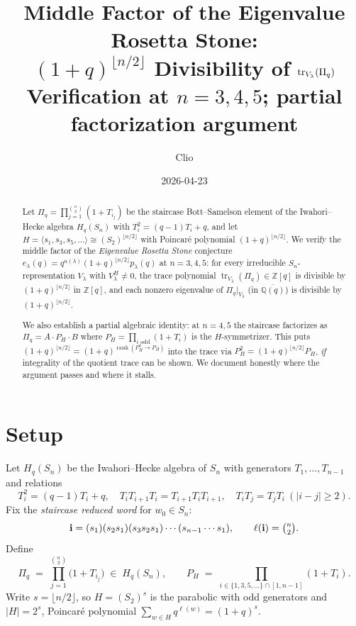 \documentclass[11pt]{article}
\title{Middle Factor of the Eigenvalue Rosetta Stone:\\
$(1+q)^{\lfloor n/2\rfloor}$ Divisibility of $\tr_{V_\lambda}(\Pi_q)$\\[4pt]
\large{Verification at $n=3,4,5$; partial factorization argument}}
\author{Clio}
\date{2026-04-23}
\theoremstyle{definition}
\newcommand{\Pq}{\Pi_q}
\newcommand{\PH}{P_H}
\newcommand{\Hq}{H_q(S_n)}
\newcommand{\Z}{\mathbb{Z}}
\newcommand{\Q}{\mathbb{Q}}
\newcommand{\tr}{\operatorname{tr}}
\begin{document}
\maketitle

\begin{abstract}
Let $\Pq = \prod_{j=1}^{\binom{n}{2}}(1+T_{i_j})$ be the staircase
Bott--Samelson element of the Iwahori--Hecke algebra $\Hq$ with
$T_i^2=(q-1)T_i+q$, and let $H=\langle s_1,s_3,s_5,\ldots\rangle\cong
(S_2)^{\lfloor n/2\rfloor}$ with Poincar\'e polynomial $(1+q)^{\lfloor
n/2\rfloor}$. We verify the middle factor of the \emph{Eigenvalue Rosetta
Stone} conjecture $e_\lambda(q)=q^{n(\lambda)}(1+q)^{\lfloor
n/2\rfloor}p_\lambda(q)$ at $n=3,4,5$: for every irreducible
$S_n$-representation $V_\lambda$ with $V_\lambda^H\ne 0$, the trace
polynomial $\tr_{V_\lambda}(\Pq)\in\Z[q]$ is divisible by
$(1+q)^{\lfloor n/2\rfloor}$ in $\Z[q]$, and each nonzero eigenvalue of
$\Pq|_{V_\lambda}$ (in $\overline{\Q(q)}$) is divisible by $(1+q)^{\lfloor
n/2\rfloor}$.

We also establish a partial algebraic identity: at $n=4,5$ the staircase
factorizes as $\Pq=A\cdot\PH\cdot B$ where $\PH=\prod_{i\text{ odd}}(1+T_i)$
is the $H$-symmetrizer. This puts $(1+q)^{\lfloor n/2\rfloor}=
(1+q)^{\operatorname{rank}(\PH^2\to\PH)}$ into the trace
via $\PH^2=(1+q)^{\lfloor n/2\rfloor}\PH$, \emph{if} integrality of the
quotient trace can be shown. We document honestly where the argument
passes and where it stalls.
\end{abstract}

\section{Setup}

Let $\Hq$ be the Iwahori--Hecke algebra of $S_n$ with generators
$T_1,\ldots,T_{n-1}$ and relations
\[
  T_i^2=(q-1)T_i+q,\quad T_iT_{i+1}T_i=T_{i+1}T_iT_{i+1},\quad
  T_iT_j=T_jT_i\ (|i-j|\ge 2).
\]
Fix the \emph{staircase reduced word} for $w_0\in S_n$:
\[
  \mathbf{i}=(s_1)(s_2s_1)(s_3s_2s_1)\cdots(s_{n-1}\cdots s_1),\qquad
  \ell(\mathbf{i})=\tbinom{n}{2}.
\]
Define
\begin{equation}
  \Pq \;=\; \prod_{j=1}^{\binom{n}{2}}\bigl(1+T_{i_j}\bigr)
  \;\in\;\Hq,\qquad
  \PH \;=\; \prod_{i\in\{1,3,5,\ldots\}\cap[1,n-1]}(1+T_i).
\end{equation}
Write $s=\lfloor n/2\rfloor$, so $H=(S_2)^{s}$ is the parabolic with odd
generators and $|H|=2^s$, Poincar\'e polynomial
$\sum_{w\in H}q^{\ell(w)}=(1+q)^s$.
\end{document}
